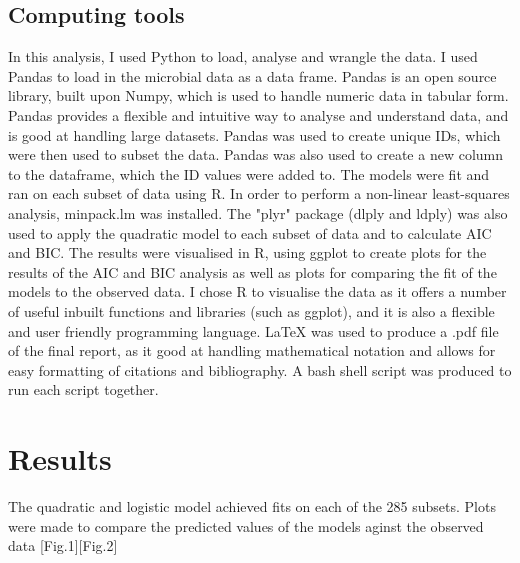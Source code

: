 \documentclass{article}[11pt]
\begin{document}
\begin{flushleft}
\subsection{Computing tools}
In this analysis, I used Python to load, analyse and wrangle the data. I used Pandas to load in the microbial data as a data frame. Pandas is an open source library, built upon  Numpy, which is used to handle numeric data in tabular form. Pandas provides a flexible and intuitive way to analyse and understand data, and is good at handling large datasets. Pandas was used to create unique IDs, which were then used to subset the data. Pandas was also used to create a new column to the dataframe, which the ID values were added to. The models were fit and ran on each subset of data using R. In order to perform a non-linear least-squares analysis, minpack.lm was installed. The "plyr" package (dlply and ldply) was also used to apply the quadratic model to each subset of data and to calculate AIC and BIC. The results were visualised in R, using ggplot to create plots for the results of the AIC and BIC analysis as well as plots for comparing the fit of the models to the observed data. I chose R to visualise the data as it offers a number of useful inbuilt functions and libraries (such as ggplot), and it is also a flexible and user friendly programming language. LaTeX was used to produce a .pdf file of the final report, as it good at handling mathematical notation and allows for easy formatting of citations and bibliography. A bash shell script was produced to run each script together. 


\newpage
\section{Results}
The quadratic and logistic model achieved fits on each of the 285 subsets. Plots were made to compare the predicted values of the models aginst the observed data [Fig.1][Fig.2]



\end{flushleft}
\end{document}
